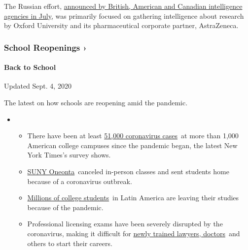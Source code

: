 The Russian effort,
\href{https://www.nytimes3xbfgragh.onion/2020/07/16/us/politics/vaccine-hacking-russia.html}{announced
by British, American and Canadian intelligence agencies in July}, was
primarily focused on gathering intelligence about research by Oxford
University and its pharmaceutical corporate partner, AstraZeneca.

\href{https://www.nytimes3xbfgragh.onion/spotlight/schools-reopening?action=click\&pgtype=Article\&state=default\&region=MAIN_CONTENT_3\&context=storylines_keepup}{}

\hypertarget{school-reopenings-}{%
\subsubsection{School Reopenings ›}\label{school-reopenings-}}

\hypertarget{back-to-school}{%
\paragraph{Back to School}\label{back-to-school}}

Updated Sept. 4, 2020

The latest on how schools are reopening amid the pandemic.

\begin{itemize}
\item
  \begin{itemize}
  \tightlist
  \item
    There have been at least
    \href{https://www.nytimes3xbfgragh.onion/interactive/2020/us/covid-college-cases-tracker.html?name=styln-coronavirus-schools-reopening\&action=click\&pgtype=Article\&state=default\&region=MAIN_CONTENT_3\&context=storylines_keepup\&region=TOP_BANNER█=storyline_menu_recirc\&action=click\&pgtype=Article\&impression_id=149dfe80-eea3-11ea-aea8-57f827c5e458\&variant=1_Show}{51,000
    coronavirus cases}~at more than 1,000 American college campuses
    since the pandemic began, the latest New York Times's survey shows.
  \item
    \href{https://www.nytimes3xbfgragh.onion/2020/09/03/nyregion/new-york-suny-oneonta-coronavirus.html?action=click\&pgtype=Article\&state=default\&region=MAIN_CONTENT_3\&context=storylines_keepup}{SUNY
    Oneonta}~canceled in-person classes and sent students home because
    of a coronavirus outbreak.
  \item
    \href{https://www.nytimes3xbfgragh.onion/2020/09/04/world/americas/latin-america-education.html?\&action=click\&pgtype=Article\&state=default\&region=MAIN_CONTENT_3\&context=storylines_keepup}{Millions
    of college students}~in Latin America are leaving their studies
    because of the pandemic.
  \item
    Professional licensing exams have been severely disrupted by the
    coronavirus, making it difficult for
    \href{https://www.nytimes3xbfgragh.onion/2020/09/04/us/bar-exam-coronavirus.html?action=click\&pgtype=Article\&state=default\&region=MAIN_CONTENT_3\&context=storylines_keepup}{newly
    trained lawyers, doctors}~and others to start their careers.
  \end{itemize}
\end{itemize}

